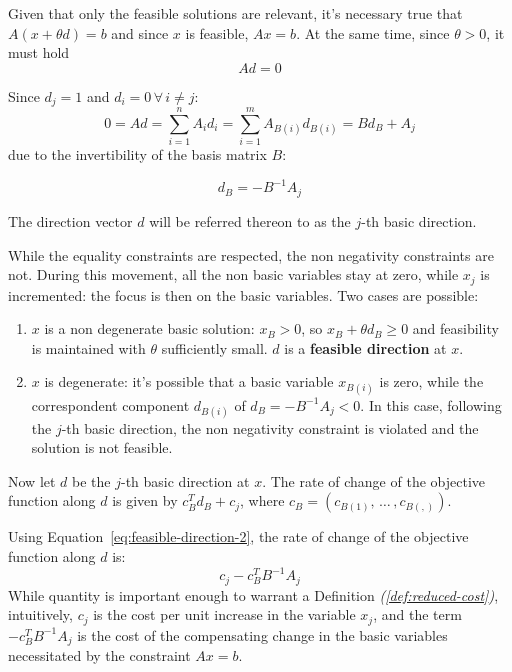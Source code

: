 \documentclass[english]{article}
\begin{document}
Given that only the feasible solutions are relevant, it's necessary true that \(A \left( x + \theta d \right) = b\) and since \(x\) is feasible, \(A x = b\).
At the same time, since \(\theta > 0\), it must hold
\begin{equation}
  \label{eq:feasible-direction-1}
  A d = 0
  \tag{A}
\end{equation}

Since \(d_j = 1\) and \(d_i = 0 \, \forall \, i \neq j\):
\[ 0 = Ad = \displaystyle \sum_{i=1}^n A_i d_i = \sum_{i=1}^{m} A_{B(i)} d_{B(i)} = B d_B + A_j \]
due to the invertibility of the basis matrix \(B\):

\begin{equation}
  \label{eq:feasible-direction-2}
  d_B = - B^{-1} A_j
  \tag{B}
\end{equation}

The direction vector \(d\) will be referred thereon to as the \(j\)-th basic direction.

While the equality constraints are respected, the non negativity constraints are not.
During this movement, all the non basic variables stay at zero, while \(x_j\) is incremented: the focus is then on the basic variables.
Two cases are possible:

\begin{enumerate}[label=\arabic*., ref=(\arabic*)]
  \item \(x\) is a non degenerate basic solution: \(x_B > 0\), so \(x_B + \theta d_B \geq 0\) and feasibility is maintained with \(\theta\) sufficiently small. \(d\) is a \textbf{feasible direction} at \(x\).
  \item \(x\) is degenerate: it's possible that a basic variable \(x_{B(i)}\) is zero, while the correspondent component \(d_{B(i)}\) of \(d_{B} = -B^{-1}A_j < 0\). In this case, following the \(j\)-th basic direction, the non negativity constraint is violated and the solution is not feasible.
\end{enumerate}

\bigskip
Now let \(d\) be the \(j\)-th basic direction at \(x\).
The rate of change of the objective function along \(d\) is given by \(c^T_B d_B + c_j\), where \(c_B = \left( c_{B(1)}, \, \ldots \,, c_{B(,)} \right)\).

Using Equation~\ref{eq:feasible-direction-2}, the rate of change of the objective function along \(d\) is:
\[ c_j - c^T_B B^{-1} A_j \]
While quantity is important enough to warrant a Definition \textit{(\ref{def:reduced-cost})},
intuitively, \(c_j\) is the cost per unit increase in the variable \(x_j\), and the term \(-c^T_B B^{-1} A_j\) is the cost of the compensating change in the basic variables necessitated by the constraint \(Ax = b\).
\end{document}
